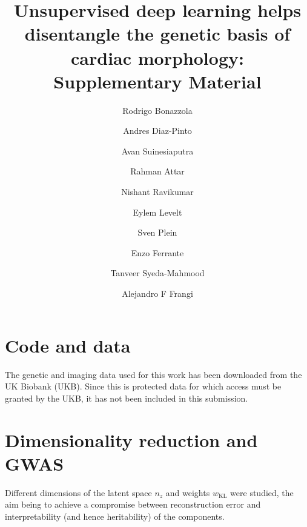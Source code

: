 \documentclass[fleqn,10pt]{wlscirep}
\def\code#1{\texttt{#1}}
\begin{document}
\title{Unsupervised deep learning helps disentangle the genetic basis of cardiac morphology: Supplementary Material}

\author[1,2,*]{Rodrigo Bonazzola}
\author[1,2]{Andres Diaz-Pinto}
\author[1,2]{Avan Suinesiaputra}
\author[1,2]{Rahman Attar}
\author[1,2]{Nishant Ravikumar}
\author[2]{Eylem Levelt}
\author[2]{Sven Plein}
\author[3]{Enzo Ferrante}
\author[4]{Tanveer Syeda-Mahmood}
\author[1,2,5]{Alejandro F Frangi}



\section{Code and data}

The genetic and imaging data used for this work has been downloaded from the UK Biobank (UKB). Since this is protected data for which access must be granted by the UKB, it has not been included in this submission.


\section{Dimensionality reduction and GWAS}

Different dimensions of the latent space $n_z$ and weights $w_{\textrm{KL}}$ were studied, the aim being to achieve a compromise between reconstruction error and interpretability (and hence heritability) of the components.
\end{document}

